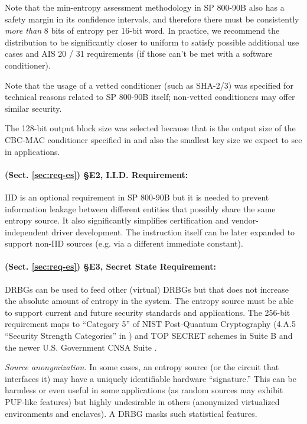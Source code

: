     Note that the min-entropy assessment methodology in SP 800-90B
    \cite{TuBaKe+18} also has a safety margin in its confidence intervals,
    and therefore there must be consistently \emph{more than} 8 bits of
    entropy per 16-bit word. In practice, we recommend the
    distribution to be significantly closer to uniform to satisfy
    possible additional use cases and AIS 20 / 31 \cite{KiSc11}
    requirements (if those can't be met with a software conditioner).

    Note that the usage of a vetted conditioner (such as SHA-2/3) was
    specified for technical reasons related to SP 800-90B itself;
    non-vetted conditioners may offer similar security.

    The 128-bit output block size was selected because that is the output
    size of the CBC-MAC conditioner specified in \cite{TuBaKe+18} and also
    the smallest key size we expect to see in applications.

    \paragraph{(Sect. \ref{sec:req-es}) \S E2, I.I.D. Requirement:}
    IID is an optional requirement in SP 800-90B \cite{TuBaKe+18} but it
    is needed to prevent information leakage between different entities that
    possibly share the same entropy source. It also significantly
    simplifies certification and vendor-independent driver development.
    The  instruction itself can be later expanded
    to support non-IID sources (e.g. via a different immediate constant).

    \paragraph{(Sect. \ref{sec:req-es}) \S E3, Secret State Requirement:}
    DRBGs can be used to feed other (virtual) DRBGs but that does not
    increase the absolute amount of entropy in the system.
    The entropy source must be able to support current and future security
    standards and applications. The 256-bit requirement maps to
    ``Category 5'' of NIST Post-Quantum Cryptography (4.A.5
    ``Security Strength Categories'' in \cite{NI16}) and TOP SECRET schemes
    in Suite B and the newer U.S. Government CNSA Suite \cite{NS15}.

    {\em Source anonymization.}
    In some cases, an entropy source (or the circuit that interfaces it)
    may have a uniquely identifiable hardware ``signature.'' This can be
    harmless or even useful in some applications (as random sources may
    exhibit PUF-like features) but highly undesirable in others (anonymized
    virtualized environments and enclaves). A DRBG masks such
    statistical features.


